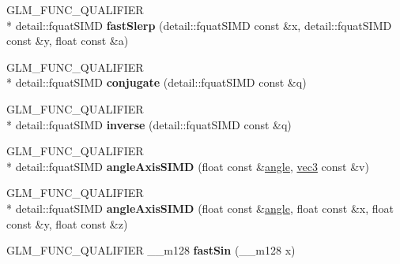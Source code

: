 \begin{DoxyCompactItemize}
\item 
\hypertarget{namespaceglm_a57c9ec50932abd564671a28cd7ba53e0}{G\-L\-M\-\_\-\-F\-U\-N\-C\-\_\-\-Q\-U\-A\-L\-I\-F\-I\-E\-R \\*
detail\-::fquat\-S\-I\-M\-D {\bfseries fast\-Slerp} (detail\-::fquat\-S\-I\-M\-D const \&x, detail\-::fquat\-S\-I\-M\-D const \&y, float const \&a)}\label{namespaceglm_a57c9ec50932abd564671a28cd7ba53e0}

\item 
\hypertarget{namespaceglm_a079af2a66c2439c64053382e8c98f213}{G\-L\-M\-\_\-\-F\-U\-N\-C\-\_\-\-Q\-U\-A\-L\-I\-F\-I\-E\-R \\*
detail\-::fquat\-S\-I\-M\-D {\bfseries conjugate} (detail\-::fquat\-S\-I\-M\-D const \&q)}\label{namespaceglm_a079af2a66c2439c64053382e8c98f213}

\item 
\hypertarget{namespaceglm_ad723ad1f3ef20438ade0e0c95002f187}{G\-L\-M\-\_\-\-F\-U\-N\-C\-\_\-\-Q\-U\-A\-L\-I\-F\-I\-E\-R \\*
detail\-::fquat\-S\-I\-M\-D {\bfseries inverse} (detail\-::fquat\-S\-I\-M\-D const \&q)}\label{namespaceglm_ad723ad1f3ef20438ade0e0c95002f187}

\item 
\hypertarget{namespaceglm_a635900a97b69fe25d76c029f130a1c8f}{G\-L\-M\-\_\-\-F\-U\-N\-C\-\_\-\-Q\-U\-A\-L\-I\-F\-I\-E\-R \\*
detail\-::fquat\-S\-I\-M\-D {\bfseries angle\-Axis\-S\-I\-M\-D} (float const \&\hyperlink{group__gtc__quaternion_ga23a3fc7ada5bbb665ff84c92c6e0542c}{angle}, \hyperlink{group__core__types_ga1c47e8b3386109bc992b6c48e91b0be7}{vec3} const \&v)}\label{namespaceglm_a635900a97b69fe25d76c029f130a1c8f}

\item 
\hypertarget{namespaceglm_a8ae8890bd658ce7217abc2112e3dca35}{G\-L\-M\-\_\-\-F\-U\-N\-C\-\_\-\-Q\-U\-A\-L\-I\-F\-I\-E\-R \\*
detail\-::fquat\-S\-I\-M\-D {\bfseries angle\-Axis\-S\-I\-M\-D} (float const \&\hyperlink{group__gtc__quaternion_ga23a3fc7ada5bbb665ff84c92c6e0542c}{angle}, float const \&x, float const \&y, float const \&z)}\label{namespaceglm_a8ae8890bd658ce7217abc2112e3dca35}

\item 
\hypertarget{namespaceglm_a81de908720e51f26e86e18d37aa5cc3b}{G\-L\-M\-\_\-\-F\-U\-N\-C\-\_\-\-Q\-U\-A\-L\-I\-F\-I\-E\-R \-\_\-\-\_\-m128 {\bfseries fast\-Sin} (\-\_\-\-\_\-m128 x)}\label{namespaceglm_a81de908720e51f26e86e18d37aa5cc3b}


\end{DoxyCompactItemize}
